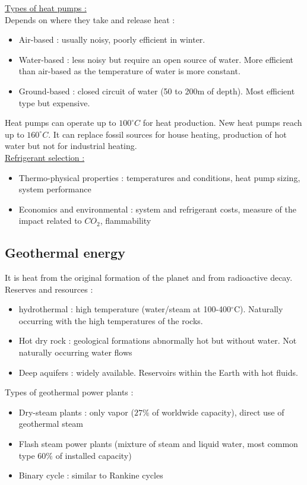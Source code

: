 \documentclass[../main.tex]{subfiles}
\begin{document}
\quad \underline{Types of heat pumps :}\\
Depends on where they take and release heat : \begin{itemize}
    \item Air-based : usually noisy, poorly efficient in winter. 
    \item Water-based : less noisy but require an open source of water. More efficient than air-based as the temperature of water is more constant.
    \item Ground-based : closed circuit of water (50 to 200m of depth). Most efficient type but expensive.
\end{itemize}

Heat pumps can operate up to $100^\circ C$ for heat production. New heat pumps reach up to $160^\circ C$. It can replace fossil sources for house heating, production of hot water but not for industrial heating.\\

\quad \underline{Refrigerant selection :}\\
\begin{itemize}
    \item Thermo-physical properties : temperatures and conditions, heat pump sizing, system performance
    \item Economics and environmental : system and refrigerant costs, measure of the impact related to $CO_2$, flammability
\end{itemize}

\subsection{Geothermal energy}
It is heat from the original formation of the planet and from radioactive decay.\\
Reserves and resources : \begin{itemize}
    \item hydrothermal : high temperature (water/steam at 100-400${}^\circ$C). Naturally occurring with the high temperatures of the rocks.
    \item Hot dry rock : geological formations abnormally hot but without water. Not naturally occurring water flows
    \item Deep aquifers : widely available. Reservoirs within the Earth with hot fluids.
\end{itemize}

Types of geothermal power plants : \begin{itemize}
    \item Dry-steam plants : only vapor ($27\%$ of worldwide capacity), direct use of geothermal steam
    \item Flash steam power plants (mixture of steam and liquid water, most common type $60\%$ of installed capacity)
    \item Binary cycle : similar to Rankine cycles
\end{itemize}
\end{document}
